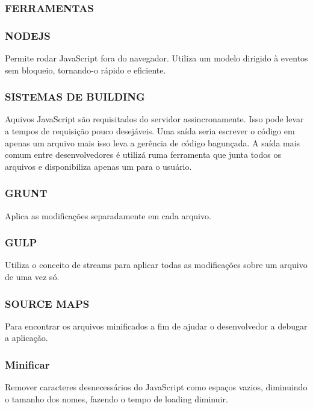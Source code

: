 \documentclass[11pt,a4paper]{article}
\begin{document}
\subsubsection{FERRAMENTAS}

\subsubsection{NODEJS}

Permite rodar JavaScript fora do navegador. Utiliza um modelo dirigido
à eventos sem bloqueio, tornando-o rápido e eficiente.

\subsubsection{SISTEMAS DE BUILDING}

Aquivos JavaScript são requisitados do servidor assincronamente. Isso
pode levar a tempos de requisição pouco desejáveis. Uma saída seria
escrever o código em apenas um arquivo mais isso leva a gerência de
código bagunçada. A saída mais comum entre desenvolvedores é utilizá
ruma ferramenta que junta todos os arquivos e disponibiliza apenas um
para o usuário.

\subsubsection{GRUNT}

Aplica as modificações separadamente em cada arquivo.

\subsubsection{GULP}

Utiliza o conceito de streams para aplicar todas as modificações sobre
um arquivo de uma vez só.

\subsubsection{SOURCE MAPS}

Para encontrar os arquivos minificados a fim de ajudar o desenvolvedor a
debugar a aplicação.

\subsubsection{Minificar}

Remover caracteres desnecessários do JavaScript como espaços vazios,
diminuindo o tamanho dos nomes, fazendo o tempo de loading diminuir.
\end{document}
